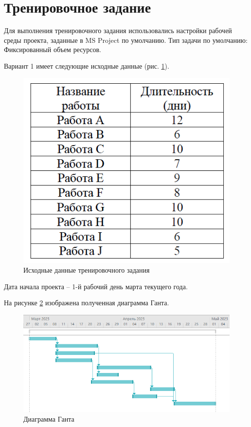 \section*{Тренировочное задание}

Для выполнения тренировочного задания использовались настройки рабочей среды проекта, заданные в MS Project по умолчанию. Тип задачи по умолчанию: Фиксированный объем ресурсов.

Вариант 1 имеет следующие исходные данные (рис. \ref{p1}).
\begin{figure}[!h]
	\centering
	\includegraphics[width=0.5\linewidth]{inc/img/1.png}
	\caption{Исходные данные тренировочного задания}
	\label{p1}
\end{figure}

Дата начала проекта – 1-й рабочий день марта текущего года.

На рисунке \ref{p2} изображена полученная диаграмма Ганта.
\begin{figure}[!h]
	\includegraphics[width=1\linewidth]{inc/img/2.png}
	\caption{Диаграмма Ганта}
	\label{p2}
\end{figure}


